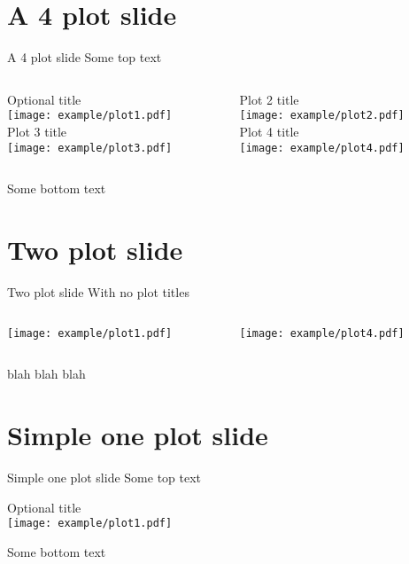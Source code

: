 
\section{A 4 plot slide}
\begin{frame}{A 4 plot slide}
Some top text
\begin{columns}
\begin{column}{0.4\textwidth}
\begin{center}
Optional title
\\
\texttt{[image: example/plot1.pdf]}
\\
Plot 3 title
\\
\texttt{[image: example/plot3.pdf]}
\\
\end{center}
\end{column}

\begin{column}{0.4\textwidth}
\begin{center}
Plot 2 title
\\
\texttt{[image: example/plot2.pdf]}
\\
Plot 4 title
\\
\texttt{[image: example/plot4.pdf]}
\\
\end{center}
\end{column}
\end{columns}
Some bottom text
\end{frame}

\section{Two plot slide}
\begin{frame}{Two plot slide}
With no plot titles
\begin{columns}
\begin{column}{0.5\textwidth}
\begin{center}
\texttt{[image: example/plot1.pdf]}
\\
\end{center}
\end{column}

\begin{column}{0.5\textwidth}
\begin{center}
\texttt{[image: example/plot4.pdf]}
\end{center}
\end{column}
\end{columns}
blah blah blah
\end{frame}

\section{Simple one plot slide}
\begin{frame}{Simple one plot slide}
Some top text
\begin{center}
Optional title
\\
\texttt{[image: example/plot1.pdf]}
\\
\end{center}
Some bottom text
\end{frame}
